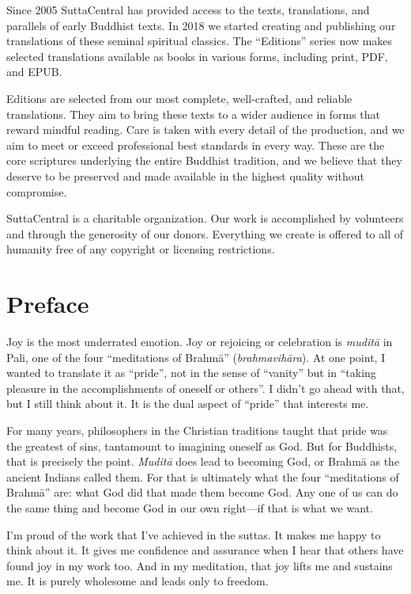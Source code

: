 \documentclass[12pt,openany]{book}%
\begin{document}
Since 2005 SuttaCentral has provided access to the texts, translations, and parallels of early Buddhist texts. In 2018 we started creating and publishing our translations of these seminal spiritual classics. The “Editions” series now makes selected translations available as books in various forms, including print, PDF, and EPUB.

Editions are selected from our most complete, well-crafted, and reliable translations. They aim to bring these texts to a wider audience in forms that reward mindful reading. Care is taken with every detail of the production, and we aim to meet or exceed professional best standards in every way. These are the core scriptures underlying the entire Buddhist tradition, and we believe that they deserve to be preserved and made available in the highest quality without compromise.

SuttaCentral is a charitable organization. Our work is accomplished by volunteers and through the generosity of our donors. Everything we create is offered to all of humanity free of any copyright or licensing restrictions. 

%
\chapter*{Preface}

Joy is the most underrated emotion. Joy or rejoicing or celebration is \textit{\textsanskrit{muditā}} in Pali, one of the four “meditations of \textsanskrit{Brahmā}” (\textit{\textsanskrit{brahmavihāra}}). At one point, I wanted to translate it as “pride”, not in the sense of “vanity” but in “taking pleasure in the accomplishments of oneself or others”. I didn’t go ahead with that, but I still think about it. It is the dual aspect of “pride” that interests me.

For many years, philosophers in the Christian traditions taught that pride was the greatest of sins, tantamount to imagining oneself as God. But for Buddhists, that is precisely the point. \textit{\textsanskrit{Muditā}} does lead to becoming God, or \textsanskrit{Brahmā} as the ancient Indians called them. For that is ultimately what the four “meditations of \textsanskrit{Brahmā}” are: what God did that made them become God. Any one of us can do the same thing and become God in our own right—if that is what we want.

I’m proud of the work that I’ve achieved in the suttas. It makes me happy to think about it. It gives me confidence and assurance when I hear that others have found joy in my work too. And in my meditation, that joy lifts me and sustains me. It is purely wholesome and leads only to freedom.
\end{document}
